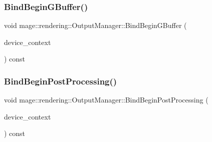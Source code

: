 \hypertarget{classmage_1_1rendering_1_1_output_manager_a93139563e5f5b58ccba4688c3b793e32}{}\label{classmage_1_1rendering_1_1_output_manager_a93139563e5f5b58ccba4688c3b793e32} 
\subsubsection{\texorpdfstring{Bind\+Begin\+G\+Buffer()}{BindBeginGBuffer()}}
{\footnotesize\ttfamily void mage\+::rendering\+::\+Output\+Manager\+::\+Bind\+Begin\+G\+Buffer (\begin{DoxyParamCaption}\item[{I\+D3\+D11\+Device\+Context \&}]{device\+\_\+context }\end{DoxyParamCaption}) const\hspace{0.3cm}{\ttfamily [noexcept]}}

\hypertarget{classmage_1_1rendering_1_1_output_manager_a6c22d77a812e3eacf32cfdb6d6a4d5f4}{}\label{classmage_1_1rendering_1_1_output_manager_a6c22d77a812e3eacf32cfdb6d6a4d5f4} 
\subsubsection{\texorpdfstring{Bind\+Begin\+Post\+Processing()}{BindBeginPostProcessing()}}
{\footnotesize\ttfamily void mage\+::rendering\+::\+Output\+Manager\+::\+Bind\+Begin\+Post\+Processing (\begin{DoxyParamCaption}\item[{I\+D3\+D11\+Device\+Context \&}]{device\+\_\+context }\end{DoxyParamCaption}) const\hspace{0.3cm}{\ttfamily [noexcept]}}

\hypertarget{classmage_1_1rendering_1_1_output_manager_affa0c4b4c9c56807fe8ad4ed802fdfd9}{}\label{classmage_1_1rendering_1_1_output_manager_affa0c4b4c9c56807fe8ad4ed802fdfd9} 
